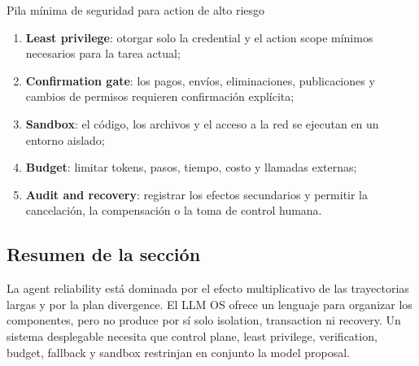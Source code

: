 \begin{importantbox}{Pila mínima de seguridad para action de alto riesgo}
\begin{enumerate}
  \item \textbf{Least privilege}: otorgar solo la credential y el action scope mínimos necesarios para la tarea actual;
  \item \textbf{Confirmation gate}: los pagos, envíos, eliminaciones, publicaciones y cambios de permisos requieren confirmación explícita;
  \item \textbf{Sandbox}: el código, los archivos y el acceso a la red se ejecutan en un entorno aislado;
  \item \textbf{Budget}: limitar tokens, pasos, tiempo, costo y llamadas externas;
  \item \textbf{Audit and recovery}: registrar los efectos secundarios y permitir la cancelación, la compensación o la toma de control humana.
\end{enumerate}
\end{importantbox}


\subsection{Resumen de la sección}

La agent reliability está dominada por el efecto multiplicativo de las trayectorias largas y por la plan divergence. El LLM OS ofrece un lenguaje para organizar los componentes, pero no produce por sí solo isolation, transaction ni recovery. Un sistema desplegable necesita que control plane, least privilege, verification, budget, fallback y sandbox restrinjan en conjunto la model proposal.
